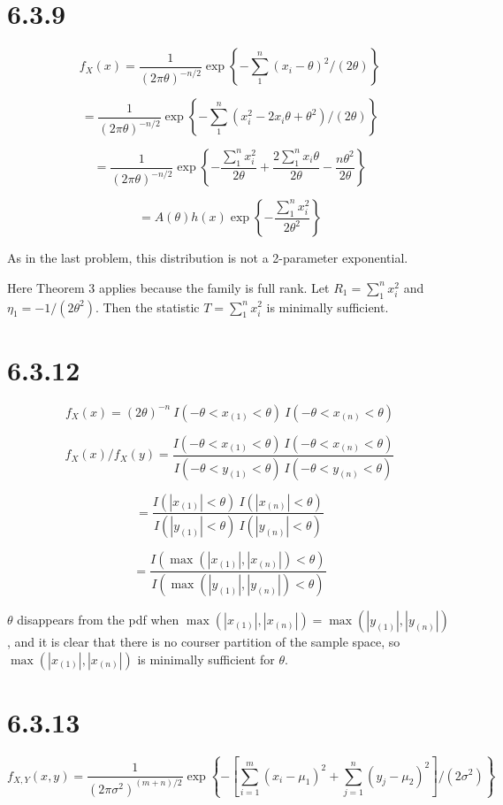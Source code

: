 \documentclass{article}
\begin{document}
\section{6.3.9}
\[
f_X(x) = \frac{1}{(2\pi\theta)^{-n/2}}
\exp \left\{ - \sum_1^n(x_i-\theta)^2/(2\theta) \right\}
\]

\[
= \frac{1}{(2\pi\theta)^{-n/2}}
\exp \left\{ - \sum_1^n(x_i^2-2x_i\theta+\theta^2)/(2\theta) \right\}
\]

\[
= \frac{1}{(2\pi\theta)^{-n/2}}
\exp \left\{-\frac{\sum_1^n x_i^2}{2\theta} + \frac{2 \sum_1^n x_i\theta}
{2\theta} - \frac{n\theta^2}{2\theta} \right\}
\]


\[
= A(\theta)h(x) \exp \left\{-\frac{\sum_1^n x_i^2}{2\theta^2} \right\}
\]

As in the last problem, this distribution is not a 2-parameter exponential.

Here Theorem 3 applies because the family is full rank. Let
$R_1 = \sum_1^n x_i^2$ and $\eta_1 = -1/(2\theta^2)$. Then the statistic
$T = \sum_1^n x_i^2$ is minimally sufficient.

\section{6.3.12}
\[
f_X(x) = (2\theta)^{-n} \ I(-\theta < x_{(1)} < \theta) \ 
I(-\theta < x_{(n)} < \theta)
\]

\[
f_X(x)/f_X(y) = \frac{I(-\theta < x_{(1)} < \theta) \ 
I(-\theta < x_{(n)} < \theta)}
{I(-\theta < y_{(1)} < \theta) \ I(-\theta < y_{(n)} < \theta)}
\]

\[
= \frac{I(|x_{(1)}| < \theta) \ I(|x_{(n)}| < \theta)}
{I(|y_{(1)}| < \theta) \ I(|y_{(n)}| < \theta)}
\]

\[
= \frac{I(\max(|x_{(1)}|,|x_{(n)}|) < \theta)}
{I(\max(|y_{(1)}|,|y_{(n)}|) < \theta)}
\]

$\theta$ disappears from the pdf when 
$\max(|x_{(1)}|,|x_{(n)}|) = \max(|y_{(1)}|,|y_{(n)}|)$, and it is clear that
there is no courser partition of the sample space, so 
$\max(|x_{(1)}|,|x_{(n)}|)$ is minimally sufficient for $\theta$.

\section{6.3.13}

\[
f_{X,Y}(x,y) = \frac{1}{(2\pi\sigma^2)^{(m+n)/2}}
\exp \left\{- \left[\sum_{i=1}^m(x_i-\mu_1)^2+\sum_{j=1}^n(y_j-\mu_2)^2\right] /(2\sigma^2)\right\}
\]
\end{document}
